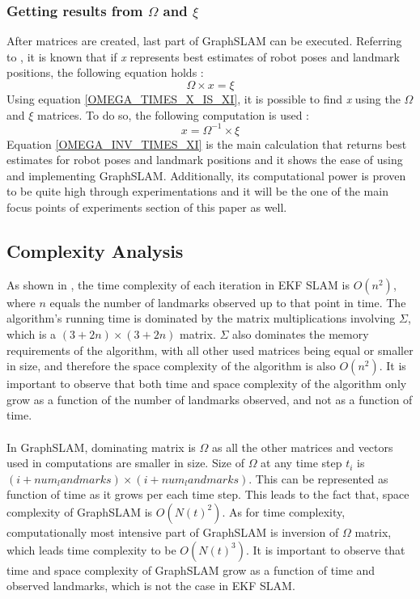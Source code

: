 \documentclass{ba-kecs}
\numberwithin{figure}{section}
\numberwithin{equation}{section}
\begin{document}
\subsubsection{Getting results from $\Omega$ and $\xi$}
	After matrices are created, last part of GraphSLAM can be executed. Referring to \cite{sik2}, it is known that if \textit{x} represents best estimates of robot poses and landmark positions, the following equation holds :
	\begin{equation}
	\Omega \times x = \xi \label{OMEGA_TIMES_X_IS_XI}
	\end{equation}
	Using equation \eqref{OMEGA_TIMES_X_IS_XI}, it is possible to find \textit{x} using the $\Omega$ and $\xi$ matrices. To do so, the following computation is used :
	\begin{equation}
	x = \Omega^{-1} \times \xi \label{OMEGA_INV_TIMES_XI}
	\end{equation}
	Equation \eqref{OMEGA_INV_TIMES_XI} is the main calculation that returns best estimates for robot poses and landmark positions and it shows the ease of using and implementing GraphSLAM. Additionally, its computational power is proven to be quite high through experimentations\cite{sik,sik2} and it will be the one of the main focus points of experiments section of this paper as well.


\subsection{Complexity Analysis}
As shown in \cite{dennis}, the time complexity of each iteration in EKF SLAM is $O(n^2)$, where $n$ equals the number of landmarks observed up to that point in time. The algorithm's running time is dominated by the matrix multiplications involving $\Sigma$, which is a $(3 + 2n) \times (3 + 2n)$ matrix. $\Sigma$ also dominates the memory requirements of the algorithm, with all other used matrices being equal or smaller in size, and therefore the space complexity of the algorithm is also $O(n^2)$. It is important to observe that both time and space complexity of the algorithm only grow as a function of the number of landmarks observed, and not as a function of time.\\ \\
In GraphSLAM, dominating matrix is $\Omega$ as all the other matrices and vectors used in computations are smaller in size. Size of $\Omega$ at any time step $t_{i}$ is $(i+num_landmarks) \times (i+num_landmarks)$. This can be represented as function of time as it grows per each time step. This leads to the fact that, space complexity of GraphSLAM is $O(N(t)^2)$. As for time complexity, computationally most intensive part of GraphSLAM is inversion of $\Omega$ matrix, which leads time complexity to be $O(N(t)^3)$. It is important to observe that time and space complexity of GraphSLAM grow as a function of time and observed landmarks, which is not the case in EKF SLAM.
\end{document}
